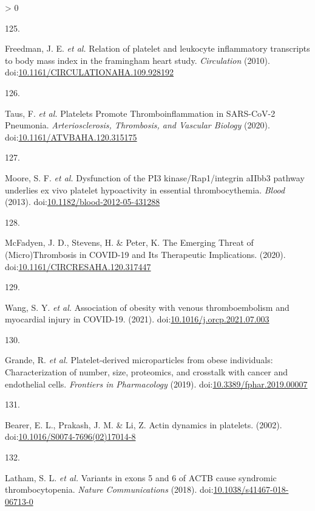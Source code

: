 \documentclass[11pt,twoside]{bristolthesis}
\newlength{\cslhangindent}
\newlength{\csllabelwidth}
\newenvironment{CSLReferences}[2] %
 {%
  \setlength{\parindent}{0pt}
  \ifodd #1 \everypar{\setlength{\hangindent}{\cslhangindent}}\ignorespaces\fi
  \ifnum #2 > 0
  \setlength{\parskip}{#2\baselineskip}
  \fi
 }%
 {}
\newcommand{\CSLLeftMargin}[1]{\parbox[t]{\csllabelwidth}{#1}}
\newcommand{\CSLRightInline}[1]{\parbox[t]{\linewidth - \csllabelwidth}{#1}\break}
\begin{document}
\begin{CSLReferences}{0}{0}
\leavevmode\hypertarget{ref-Freedman2010}{}%
\CSLLeftMargin{125. }
\CSLRightInline{Freedman, J. E. \emph{et al.} {Relation of platelet and leukocyte inflammatory transcripts to body mass index in the framingham heart study}. \emph{Circulation} (2010). doi:\href{https://doi.org/10.1161/CIRCULATIONAHA.109.928192}{10.1161/CIRCULATIONAHA.109.928192}}

\leavevmode\hypertarget{ref-Taus2020}{}%
\CSLLeftMargin{126. }
\CSLRightInline{Taus, F. \emph{et al.} {Platelets Promote Thromboinflammation in SARS-CoV-2 Pneumonia}. \emph{Arteriosclerosis, Thrombosis, and Vascular Biology} (2020). doi:\href{https://doi.org/10.1161/ATVBAHA.120.315175}{10.1161/ATVBAHA.120.315175}}

\leavevmode\hypertarget{ref-Moore2013}{}%
\CSLLeftMargin{127. }
\CSLRightInline{Moore, S. F. \emph{et al.} {Dysfunction of the PI3 kinase/Rap1/integrin aIIbb3 pathway underlies ex vivo platelet hypoactivity in essential thrombocythemia}. \emph{Blood} (2013). doi:\href{https://doi.org/10.1182/blood-2012-05-431288}{10.1182/blood-2012-05-431288}}

\leavevmode\hypertarget{ref-McFadyen2020}{}%
\CSLLeftMargin{128. }
\CSLRightInline{McFadyen, J. D., Stevens, H. \& Peter, K. {The Emerging Threat of (Micro)Thrombosis in COVID-19 and Its Therapeutic Implications}. (2020). doi:\href{https://doi.org/10.1161/CIRCRESAHA.120.317447}{10.1161/CIRCRESAHA.120.317447}}

\leavevmode\hypertarget{ref-Wang2021}{}%
\CSLLeftMargin{129. }
\CSLRightInline{Wang, S. Y. \emph{et al.} {Association of obesity with venous thromboembolism and myocardial injury in COVID-19}. (2021). doi:\href{https://doi.org/10.1016/j.orcp.2021.07.003}{10.1016/j.orcp.2021.07.003}}

\leavevmode\hypertarget{ref-Grande2019}{}%
\CSLLeftMargin{130. }
\CSLRightInline{Grande, R. \emph{et al.} {Platelet-derived microparticles from obese individuals: Characterization of number, size, proteomics, and crosstalk with cancer and endothelial cells}. \emph{Frontiers in Pharmacology} (2019). doi:\href{https://doi.org/10.3389/fphar.2019.00007}{10.3389/fphar.2019.00007}}

\leavevmode\hypertarget{ref-Bearer2002}{}%
\CSLLeftMargin{131. }
\CSLRightInline{Bearer, E. L., Prakash, J. M. \& Li, Z. {Actin dynamics in platelets}. (2002). doi:\href{https://doi.org/10.1016/S0074-7696(02)17014-8}{10.1016/S0074-7696(02)17014-8}}

\leavevmode\hypertarget{ref-Latham2018}{}%
\CSLLeftMargin{132. }
\CSLRightInline{Latham, S. L. \emph{et al.} {Variants in exons 5 and 6 of ACTB cause syndromic thrombocytopenia}. \emph{Nature Communications} (2018). doi:\href{https://doi.org/10.1038/s41467-018-06713-0}{10.1038/s41467-018-06713-0}}


\end{CSLReferences}
\end{document}
